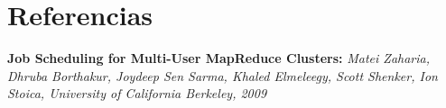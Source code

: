 \section{Referencias}
\label{sec:Ref}
\textbf{Job Scheduling for Multi-User MapReduce Clusters: } \emph{Matei Zaharia, Dhruba Borthakur, Joydeep Sen Sarma, Khaled Elmeleegy, Scott Shenker, Ion Stoica, University of California Berkeley, 2009}



